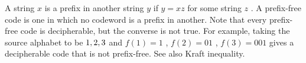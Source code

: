 A string  $ x $  is a  prefix in another string  $ y $  if
 $ y=xz $  for some string  $ z $ .  A prefix-free code is one in which
no codeword is a prefix in another.  Note that every prefix-free code
is decipherable, but the converse is not true. For example, taking
the source alphabet to be  $  \\{1,2,3 \\} $  and  $ f(1)=1 $ ,  $ f(2)=01 $ ,
 $ f(3)=001 $  gives a decipherable code that is not prefix-free.
See also Kraft inequality.



